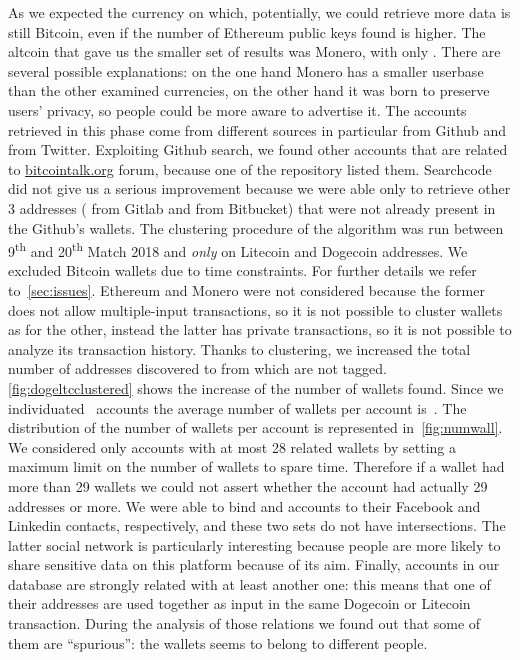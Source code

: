 As we expected the currency on which, potentially, we could retrieve more data
is still Bitcoin, even if the number of Ethereum public keys found is higher.
The altcoin that gave us the smaller set of results was Monero, with only
\startingXMR{}. There are several possible explanations: on the one hand Monero
has
a smaller userbase than the other examined currencies, on the other hand it was
born to preserve users' privacy, so people could be more aware to advertise it.
The accounts retrieved in this phase come from different sources in particular
\accountGithub{} from Github and \accountTwitter{} from Twitter.
Exploiting Github search, we found other \accountBitcointalk{}
accounts that are related to \url{bitcointalk.org} forum, because one
of the repository listed them. Searchcode did not give us a serious improvement
because we were able only to retrieve other 3 addresses (\accountGitlab{} from
Gitlab and \accountBitbucket{} from Bitbucket) that were not already present in
the Github's wallets.
The clustering procedure of the algorithm was run between 9\textsuperscript{th}
and 20\textsuperscript{th} Match 2018 and \emph{only} on Litecoin and Dogecoin
addresses. We excluded Bitcoin wallets due to time constraints.
For further details we refer to~\autoref{sec:issues}. Ethereum and Monero were
not considered because the former does not allow multiple-input transactions,
so it is not possible to cluster wallets as for the other, instead the latter
has private transactions, so it is not possible to analyze its transaction
history.
Thanks to clustering, we increased the total number of addresses
discovered
to \clusteringNumberAllWallets{} from which
\clusteringNumberWalletsNotService{} are not tagged.
\autoref{fig:dogeltcclustered} shows the increase of the number of
wallets found.
Since we individuated~\accountNumber{} accounts the average number
of wallets per account is~\avarageAccount{}.
The distribution of the number of wallets per account is represented
in~\autoref{fig:numwall}. We considered only accounts with at most 28 related
wallets by setting a maximum limit on the number of
wallets to spare time.
Therefore if a wallet had more than 29 wallets we could not assert whether
the account had actually 29 addresses or more.
We were able to bind \facebookRelatedAccounts{} and \linkedinRelatedAccount{}
accounts to their Facebook and Linkedin contacts, respectively, and these two
sets do not have intersections. The latter social network is particularly
interesting because people are more likely to share sensitive data on this
platform because of its aim.
Finally, \accountRelated{} accounts in our database are strongly related with
at least another one: this means that one of their addresses are used together
as input in the same Dogecoin or Litecoin transaction. During the analysis of
those relations we found out that some of them are ``spurious'': the wallets
seems to belong to different people.

